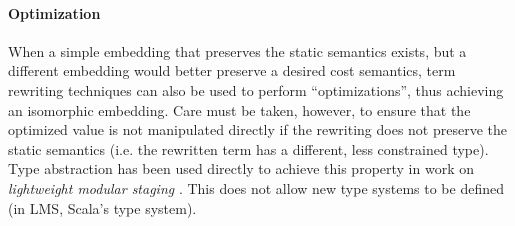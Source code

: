 \documentclass[10pt,preprint]{sigplanconf}
\begin{document}


\paragraph{Optimization}
When a simple embedding that preserves the static semantics exists, but a different  embedding would better preserve a desired cost semantics, term rewriting techniques can also be used to perform ``optimizations'', thus achieving an isomorphic embedding. Care must be taken, however, to ensure that the optimized value is not manipulated directly if the rewriting does not preserve the static semantics (i.e. the rewritten term has a different, less constrained type). Type abstraction has been used directly to achieve this property in work on \emph{lightweight modular staging} \cite{Rompf:2012:LMS}. This does not allow new type systems to be defined (in LMS, Scala's type system). %
\end{document}
